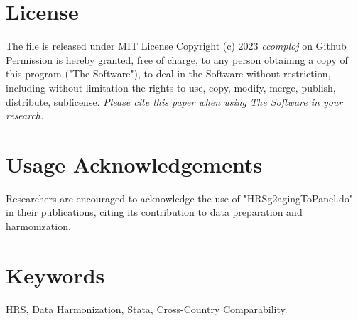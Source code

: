 \documentclass{article}
\begin{document}
\section{License}
The file is released under MIT License Copyright (c) 2023 \textit{ccomploj} on Github Permission is hereby granted, free of charge, to any person obtaining a copy of this program ("The Software"), to deal in the Software without restriction, including without limitation the rights to use, copy, modify, merge, publish, distribute, sublicense. \textit{Please cite this paper when using The Software in your research.}



\section{Usage Acknowledgements}
Researchers are encouraged to acknowledge the use of "HRSg2agingToPanel.do" in their publications, citing its contribution to data preparation and harmonization.


\section{Keywords}
HRS, Data Harmonization, Stata, Cross-Country Comparability.
\end{document}
